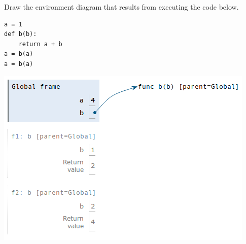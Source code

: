 
\question Draw the environment diagram that results from executing the
code below.

\begin{lstlisting}
a = 1
def b(b):
    return a + b
a = b(a)
a = b(a)
\end{lstlisting}

\begin{solution}[2.5in]
\begin{center}
\includegraphics{ab.png}
\end{center}
\end{solution}
